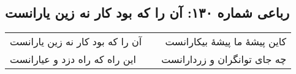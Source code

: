 \begin{center}
\section*{رباعی شماره ۱۳۰: آن را که بود کار نه زین یارانست}
\label{sec:0130}
\begin{longtable}{l p{0.5cm} r}
آن را که بود کار نه زین یارانست
&&
کاین پیشهٔ ما پیشهٔ بیکارانست
\\
این راه که راه دزد و عیارانست
&&
چه جای توانگران و زردارانست
\\
\end{longtable}
\end{center}
